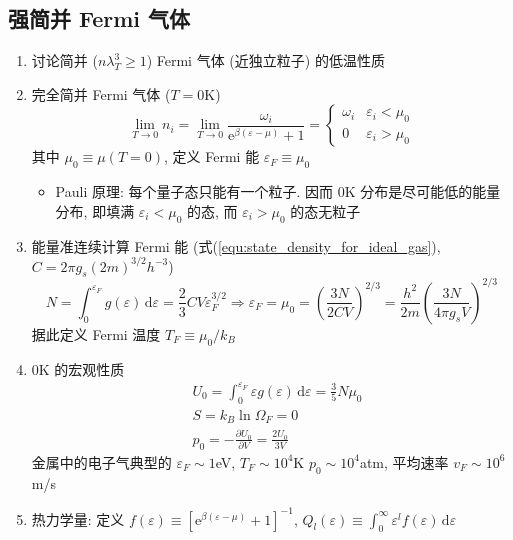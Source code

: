\documentclass[12pt,a4paper]{article}%
\numberwithin{equation}{section}
\newcommand{\diff}{\,\mathrm{d}}
\newcommand\e{\mathrm{e}}%
\begin{document}
\subsection{强简并 Fermi 气体} %
\label{sub:fermi_gas}
\begin{enumerate}
    \item 讨论简并 ($n\lambda_T^3 \ge 1$) Fermi 气体 (近独立粒子) 的低温性质
    \item 完全简并 Fermi 气体 ($T = 0$K)
    \begin{equation}
        \lim_{T\to 0}n_i = \lim_{T\to 0}\frac{\omega_i}{\e^{\beta(\varepsilon - \mu)}+1} = \begin{cases}
        \omega_i & \varepsilon_i < \mu_0 \\
        0        & \varepsilon_i > \mu_0
        \end{cases}
    \end{equation}
    其中 $\mu_0\equiv\mu(T = 0)$, 
    定义 Fermi 能 $\varepsilon_F \equiv \mu_0$
    \begin{itemize}
        \item Pauli 原理: 每个量子态只能有一个粒子. 
        因而 $0$K 分布是尽可能低的能量分布, 
        即填满 $\varepsilon_i < \mu_0$ 的态, 
        而 $\varepsilon_i > \mu_0$ 的态无粒子
    \end{itemize}
    \item 能量准连续计算 Fermi 能 (式(\ref{equ:state_density_for_ideal_gas}), $C = 2\pi g_s(2m)^{3/2} h^{-3}$)
    \begin{equation}\label{equ:fermi_mu0}
        N = \int_0^{\varepsilon_F}g(\varepsilon)\diff\varepsilon 
        = \frac 23 CV\varepsilon_F^{3/2} \Rightarrow
        \varepsilon_F = \mu_0 = \left(\frac{3N}{2CV}\right)^{2/3} = \frac{h^2}{2m}\left(\frac{3N}{4\pi g_sV}\right)^{2/3}
    \end{equation}
    据此定义 Fermi 温度 $T_F \equiv \mu_0 /k_B$
    \item $0$K 的宏观性质
    \begin{align}
        &U_0 = \int_0^{\varepsilon_F}\varepsilon g(\varepsilon)\diff\varepsilon = \frac 35 N\mu_0 \\
        &S = k_B\ln\Omega_F = 0 \\
        &p_0 = -\frac{\partial U_0}{\partial V} = \frac{2U_0}{3V}
    \end{align}
    金属中的电子气典型的 
    $\varepsilon_F\sim 1$eV, 
    $T_F \sim 10^4$K
    $p_0\sim 10^4$atm, 
    平均速率 $v_F\sim 10^6$m/s
    \item 热力学量: 定义 $f(\varepsilon) \equiv \left[\e^{\beta(\varepsilon-\mu)}+1\right]^{-1}$, $Q_l(\varepsilon)\equiv\int_0^\infty\varepsilon^lf(\varepsilon)\diff\varepsilon$

\end{enumerate}
\end{document}
